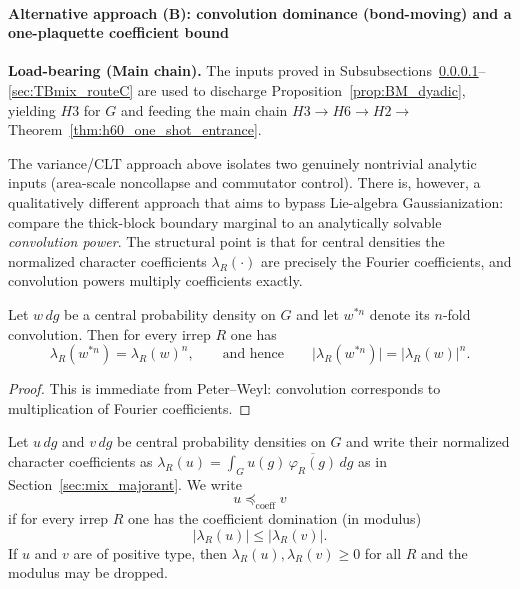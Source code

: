 \paragraph{Alternative approach (B): convolution dominance (bond-moving) and a one-plaquette coefficient bound}\label{sec:TBmix_chessboard}

\noindent\textbf{Load-bearing (Main chain).} The inputs proved in Subsubsections~\ref{sec:TBmix_chessboard}--\ref{sec:TBmix_routeC} are used to discharge Proposition~\ref{prop:BM_dyadic}, yielding $H3$ for $G$ and feeding the main chain $H3\to H6\to H2\to$ Theorem~\ref{thm:h60_one_shot_entrance}.


The variance/CLT approach above isolates two genuinely nontrivial analytic inputs (area-scale noncollapse and commutator control).
There is, however, a qualitatively different approach that aims to bypass Lie-algebra Gaussianization:
compare the thick-block boundary marginal to an analytically solvable \emph{convolution power}.
The structural point is that for central densities the normalized character coefficients $\lambda_R(\cdot)$ are precisely the Fourier coefficients,
and convolution powers multiply coefficients exactly.

\begin{lemma}\label{lem:conv_coeff_mult}
Let $w\,dg$ be a central probability density on $G$ and let $w^{*n}$ denote its $n$-fold convolution.
Then for every irrep $R$ one has
\[
\lambda_R(w^{*n})=\lambda_R(w)^n,
\qquad\text{and hence}\qquad
\bigl|\lambda_R(w^{*n})\bigr|=\bigl|\lambda_R(w)\bigr|^n.
\]
\end{lemma}
\begin{proof}
This is immediate from Peter--Weyl: convolution corresponds to multiplication of Fourier coefficients.
\end{proof}


\begin{definition}\label{def:coeff_domination}
Let $u\,dg$ and $v\,dg$ be central probability densities on $G$ and write their normalized character coefficients as
$\lambda_R(u)=\int_G u(g)\,\overline{\varphi_R(g)}\,dg$ as in Section~\ref{sec:mix_majorant}.
We write
\[
u \preceq_{\mathrm{coeff}} v
\]
if for every irrep $R$ one has the coefficient domination (in modulus)
\[
\big|\lambda_R(u)\big|\le \big|\lambda_R(v)\big|.
\]
If $u$ and $v$ are of positive type, then $\lambda_R(u),\lambda_R(v)\ge 0$ for all $R$ and the modulus may be dropped.
\end{definition}

